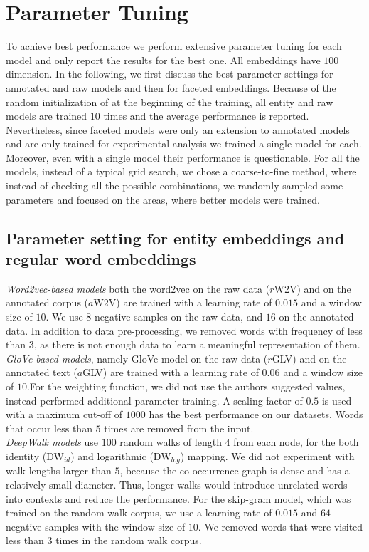 \section{Parameter Tuning } \label{sec:setup}
 To achieve best performance we perform extensive parameter tuning for each model and only report the results for the best one. All embeddings have $100$ dimension. In the following, we first discuss the best parameter settings for annotated and raw models and then for faceted embeddings. Because of the random initialization of at the beginning of the training, all entity and raw models are trained $10$ times and the average performance is reported. Nevertheless, since faceted models were only an extension to annotated models and are only trained for experimental analysis we trained a single model for each. Moreover, even with a single model their performance is questionable. For all the models, instead of a typical grid search, we chose a coarse-to-fine method, where instead of checking all the possible combinations, we randomly sampled some parameters and focused on the areas, where better models were trained.
\subsection{Parameter setting for  entity embeddings and regular word embeddings  }
 
\emph{Word2vec-based models} both the word2vec on the raw data ($r$W2V) and on the annotated corpus ($a$W2V) are trained with a learning rate of $0.015$ and a window size of $10$. We use $8$ negative samples on the raw data, and $16$ on the annotated data. In addition to data pre-processing, we removed words with frequency of less than $3$, as there is not enough data to learn a meaningful representation of them. \\

\noindent
\emph{GloVe-based models}, namely GloVe model on the raw data ($r$GLV) and on the annotated text ($a$GLV) are trained with a learning rate of $0.06$ and a window size of $10$.For the weighting function, we did not use the authors suggested values, instead performed additional parameter training. A scaling factor of $0.5$ is used with a maximum cut-off of $1000$ has the best performance on our datasets. Words that occur less than $5$ times are removed from the input.\\

\noindent
\emph{DeepWalk models} use $100$ random walks of length $4$ from each node, for the both identity (DW$_{id}$) and logarithmic (DW$_{log}$) mapping. We did not experiment with walk lengths larger than $5$, because the co-occurrence graph is dense and has a relatively small diameter.  Thus, longer walks would introduce unrelated words into contexts and reduce the performance. For the skip-gram model, which was trained on the random walk corpus, we use a learning rate of $0.015$ and $64$ negative samples with the window-size of $10$. We removed words that were visited less than $3$ times in the random walk corpus. \\

